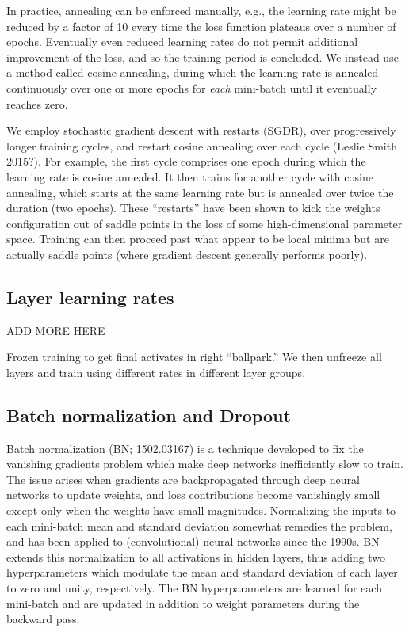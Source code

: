 \documentclass[fleqn,usenatbib]{mnras}
\begin{document}
In practice, annealing can be enforced manually, e.g., the learning rate might be reduced by a factor of 10 every time the loss function plateaus over a number of epochs.
Eventually even reduced learning rates do not permit additional improvement of the loss, and so the training period is concluded.
We instead use a method called cosine annealing, during which the learning rate is annealed continuously over one or more epochs for \textit{each} mini-batch until it eventually reaches zero.

We employ stochastic gradient descent with restarts (SGDR), over progressively longer training cycles, and restart cosine annealing over each cycle (Leslie Smith 2015?).
For example, the first cycle comprises one epoch during which the learning rate is cosine annealed.
It then trains for another cycle with cosine annealing, which starts at the same learning rate but is annealed over twice the duration (two epochs).
These ``restarts'' have been shown to kick the weights configuration out of saddle points in the loss of some high-dimensional parameter space.
Training can then proceed past what appear to be local minima but are actually saddle points (where gradient descent generally performs poorly).


\subsection{Layer learning rates}
ADD MORE HERE

Frozen training to get final activates in right ``ballpark.''
We then unfreeze all layers and train using different rates in different layer groups.

\subsection{Batch normalization and Dropout}\label{sec:norm and drop}
Batch normalization (BN; 1502.03167) is a technique developed to fix the vanishing gradients problem which make deep networks inefficiently slow to train.
The issue arises when gradients are backpropagated through deep neural networks to update weights, and loss contributions become vanishingly small except only when the weights have small magnitudes.
Normalizing the inputs to each mini-batch mean and standard deviation somewhat remedies the problem, and has been applied to (convolutional) neural networks since the 1990s.
BN extends this normalization to all activations in hidden layers, thus adding two hyperparameters which modulate the mean and standard deviation of each layer to zero and unity, respectively.
The BN hyperparameters are learned for each mini-batch and are updated in addition to weight parameters during the backward pass.
\end{document}

